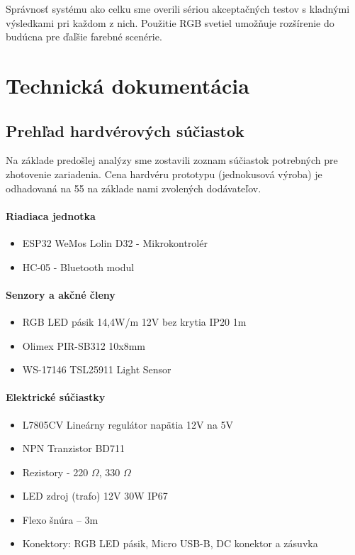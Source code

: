 \documentclass[12pt, a4paper]{article}
\begin{document}
Správnosť systému ako celku sme overili sériou akceptačných testov s kladnými výsledkami pri každom z nich. Použitie RGB svetiel umožňuje rozšírenie do budúcna pre ďaľšie farebné scenérie.

\printbibliography[title={Zoznam použitej literatúry}]

\section{Technická dokumentácia}
\subsection{Prehľad hardvérových súčiastok}
Na základe predošlej analýzy sme zostavili zoznam súčiastok potrebných pre zhotovenie zariadenia. Cena hardvéru prototypu (jednokusová výroba) je odhadovaná na 55 \texteuro na základe nami zvolených dodávateľov.

\paragraph{Riadiaca jednotka}
\begin{itemize}
\itemsep0pt
\item ESP32 WeMos Lolin D32 - Mikrokontrolér
\item HC-05 - Bluetooth modul
\end{itemize}

\paragraph{Senzory a akčné členy}
\begin{itemize}
\itemsep0pt
\item RGB LED pásik 14,4W/m 12V bez krytia IP20 1m
\item Olimex PIR-SB312 10x8mm 
\item WS-17146 TSL25911 Light Sensor
\end{itemize}

\paragraph{Elektrické súčiastky}
\begin{itemize}
\itemsep0pt
\item L7805CV Lineárny regulátor napätia 12V na 5V
\item NPN Tranzistor BD711 
\item Rezistory - 220 $\Omega$, 330 $\Omega$
\item LED zdroj (trafo) 12V 30W IP67
\item Flexo šnúra – 3m
\item Konektory: RGB LED pásik, Micro USB-B, DC konektor a zásuvka
\end{itemize}
\end{document}
